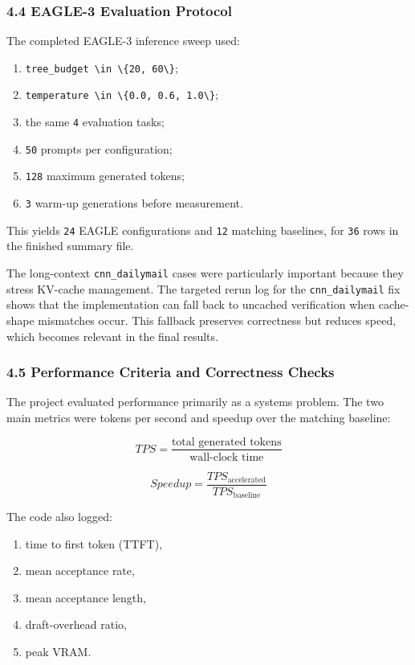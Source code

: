 \documentclass[
]{article}
\begin{document}
\subsubsection{4.4 EAGLE-3 Evaluation
Protocol}\label{44-eagle-3-evaluation-protocol}

The completed EAGLE-3 inference sweep used:

\begin{enumerate}
\def\labelenumi{\arabic{enumi}.}
\item
  \texttt{tree\_budget\ \textbackslash{}in\ \textbackslash{}\{20,\ 60\textbackslash{}\}};
\item
  \texttt{temperature\ \textbackslash{}in\ \textbackslash{}\{0.0,\ 0.6,\ 1.0\textbackslash{}\}};
\item
  the same \texttt{4} evaluation tasks;
\item
  \texttt{50} prompts per configuration;
\item
  \texttt{128} maximum generated tokens;
\item
  \texttt{3} warm-up generations before measurement.
\end{enumerate}

This yields \texttt{24} EAGLE configurations and \texttt{12} matching
baselines, for \texttt{36} rows in the finished summary file.

The long-context \texttt{cnn\_dailymail} cases were particularly
important because they stress KV-cache management. The targeted rerun
log for the \texttt{cnn\_dailymail} fix shows that the implementation
can fall back to uncached verification when cache-shape mismatches
occur. This fallback preserves correctness but reduces speed, which
becomes relevant in the final results.

\subsubsection{4.5 Performance Criteria and Correctness
Checks}\label{45-performance-criteria-and-correctness-checks}

The project evaluated performance primarily as a systems problem. The
two main metrics were tokens per second and speedup over the matching
baseline:

\[TPS = \frac{\text{total generated tokens}}{\text{wall-clock time}}\]

\[Speedup = \frac{TPS_{\text{accelerated}}}{TPS_{\text{baseline}}}\]

The code also logged:

\begin{enumerate}
\def\labelenumi{\arabic{enumi}.}
\item
  time to first token (TTFT),
\item
  mean acceptance rate,
\item
  mean acceptance length,
\item
  draft-overhead ratio,
\item
  peak VRAM.
\end{enumerate}
\end{document}
